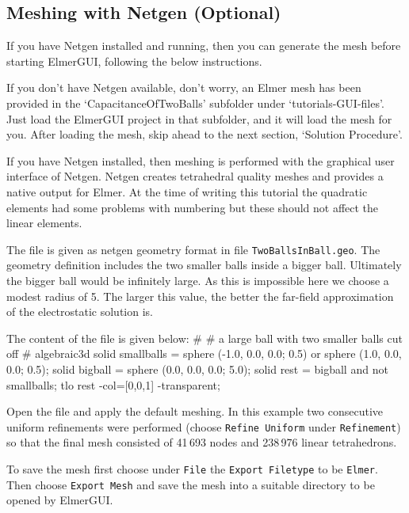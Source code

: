 \subsection*{Meshing with Netgen (Optional)}

If you have Netgen installed and running, then you can generate the mesh before starting ElmerGUI, following the below instructions.  

If you don't have Netgen available, don't worry, an Elmer mesh has been provided in the `CapacitanceOfTwoBalls'  subfolder under `tutorials-GUI-files'.  Just load the ElmerGUI project in that subfolder, and it will load the mesh for you.  After loading the mesh, skip ahead to the next section, `Solution Procedure'.

If you have Netgen installed, then meshing is performed with the graphical user interface of Netgen. Netgen creates tetrahedral quality meshes and provides a native output for Elmer.
At the time of writing this tutorial the quadratic elements had some problems with numbering 
but these should not affect the linear elements.

The file is given as netgen geometry format in file \texttt{TwoBallsInBall.geo}. The geometry definition includes the 
two smaller balls inside a bigger ball. Ultimately the bigger ball would be infinitely large. As this is impossible 
here we choose a modest radius of 5. The larger this value, the better the far-field approximation of the 
electrostatic solution is.

The content of the file is given below:
\ttbegin
#
# a large ball with two smaller balls cut off
#
algebraic3d
solid smallballs = sphere (-1.0, 0.0, 0.0; 0.5)
           or sphere (1.0, 0.0, 0.0; 0.5);
solid bigball = sphere (0.0, 0.0, 0.0; 5.0);
solid rest = bigball and not smallballs;
tlo rest -col=[0,0,1] -transparent;
\ttend

Open the file and apply the default meshing. In this example two consecutive uniform refinements were performed 
(choose \texttt{Refine Uniform} under \texttt{Refinement}) so that the 
final mesh consisted of 41\,693 nodes and 238\,976 linear tetrahedrons. 

To save the mesh first choose under \texttt{File} the \texttt{Export Filetype} to be \texttt{Elmer}. Then choose
\texttt{Export Mesh} and save the mesh into a suitable directory to be opened
by ElmerGUI. 

